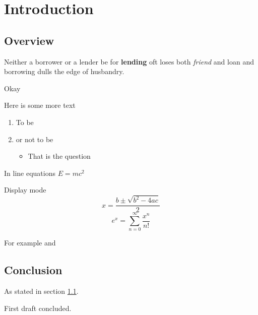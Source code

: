 \chapter{Introduction}

\section{Overview}
\label{Sec:Overview}

Neither a borrower or a lender be for \textbf{lending} oft loses both \textit{friend} and loan and borrowing dulls the edge of husbandry.

 Okay
 
 Here is some more text

\begin{enumerate}
\item To be
\item or not to be
\begin{itemize}
\item That is the question
\end{itemize}
\end{enumerate}

In line equations $E=mc^2$

Display mode
\[
x = \frac{b\pm\sqrt{b^2-4ac}}{2}
\]
\[
e^x = \sum_{n=0}^\infty \frac{x^n}{n!}
\]

For example \cite[Section 3]{Bunce2003ThePreduals} and \cite{Kaup1977AlgebraicBanachmanifolds}

\section{Conclusion}

As stated in section \ref{Sec:Overview}.

First draft concluded.